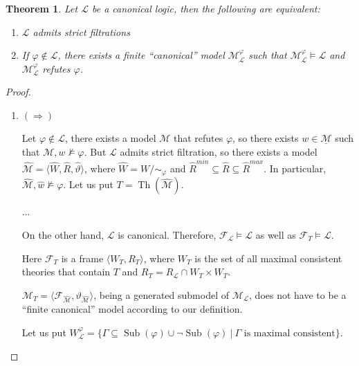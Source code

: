 \documentclass[a4paper]{article}
\theoremstyle{defin}
\theoremstyle{theorem}
\newtheorem{theorem}{Theorem}
\theoremstyle{prop}
\theoremstyle{lemma}
\theoremstyle{fact}
\theoremstyle{ex}
\theoremstyle{col}
\begin{document}
\begin{theorem} Let $\mathcal{L}$ be a canonical logic, then the following are equivalent:
  \begin{enumerate}
    \item $\mathcal{L}$ admits strict filtrations
    \item If $\varphi \not\in \mathcal{L}$, there exists a finite ``canonical'' model $\mathcal{M}_{\mathcal{L}}^{\varphi}$ such that
    $\mathcal{M}_{\mathcal{L}}^{\varphi} \models \mathcal{L}$ and
    $\mathcal{M}_{\mathcal{L}}^{\varphi}$ refutes $\varphi$.
  \end{enumerate}
\end{theorem}

\begin{proof}
  $ $

  \begin{enumerate}
    \item $(\Rightarrow)$

    Let $\varphi \not\in \mathcal{L}$, there exists a model $\mathcal{M}$ that refutes $\varphi$, so there exists $w \in \underline{\mathcal{M}}$ such that $\mathcal{M}, w \nvDash \varphi$. But $\mathcal{L}$ admits strict filtration, so there exists a model
    $\widehat{\mathcal{M}} = \langle \widehat{W}, \widehat{R}, \widehat{\vartheta} \rangle$, where $\widehat{W} = W / \sim_{\varphi}$ and $\hat{R}^{min} \subseteq \widehat{R} \subseteq \hat{R}^{max}$. In particular, $\widehat{\mathcal{M}}, \widehat{w} \nvDash \varphi$.
    Let us put $T = \operatorname{Th}(\widehat{\mathcal{M}})$.

    ...

    On the other hand, $\mathcal{L}$ is canonical. Therefore, $\mathcal{F}_{\mathcal{L}} \models \mathcal{L}$ as well as $\mathcal{F}_{T} \models \mathcal{L}$.

    Here $\mathcal{F}_{T}$ is a frame $\langle W_T, R_T \rangle$, where $W_T$ is the set of all maximal consistent theories that contain $T$ and $R_T = R_{\mathcal{L}} \cap W_T \times W_T$.

    $\mathcal{M}_{T} = \langle \mathcal{F}_{\widehat{\mathcal{M}}}, \vartheta_{\widehat{\mathcal{M}}} \rangle$,
    being a generated submodel of $\mathcal{M}_{\mathcal{L}}$, does not have to be a ``finite canonical'' model according to our definition.

    Let us put $W_{\mathcal{L}}^{\varphi} = \{ \Gamma \subseteq \operatorname{Sub}(\varphi) \cup \neg \operatorname{Sub}(\varphi) \: | \: \Gamma \text{ is maximal consistent} \}$.


\end{enumerate}
\end{proof}
\end{document}
